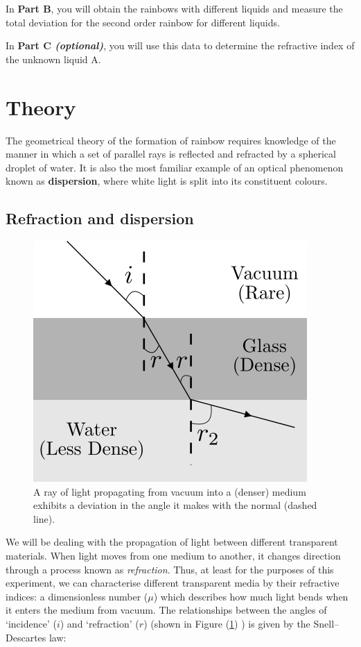 In \textbf{Part B}, you will obtain the rainbows with different liquids and measure the total deviation for the second order rainbow for different liquids.

In \textbf{Part C \textit{(optional)}}, you will use this data to determine the refractive index of the unknown liquid A. 


\section*{Theory}
The geometrical theory of the formation of rainbow requires knowledge of the manner in which a set of parallel rays is reflected and refracted by a spherical droplet of water. It is also the most familiar example of an optical phenomenon known as \textbf{dispersion}, where white light is split into its constituent colours. 

\subsection*{Refraction and dispersion}

\begin{figure}[!htb]
    \centering
    \includegraphics[scale=0.5]{figs/snell.png}
    \caption{A ray of light propagating from vacuum into a (denser) medium exhibits a deviation in the angle it makes with the normal (dashed line).}
    \label{fig:snell}
\end{figure}

We will be dealing with the propagation of light between different transparent materials. When light moves from one medium to another, it changes direction through a process known as \textit{refraction}. Thus, at least for the purposes of this experiment, we can characterise different transparent media by their refractive indices: a dimensionless number ($\mu$) which describes how much light bends when it enters the medium from vacuum. The relationships between the angles of `incidence' ($i$) and `refraction' ($r$) (shown in Figure (\ref{fig:snell}) ) is given by the Snell–Descartes law: 

